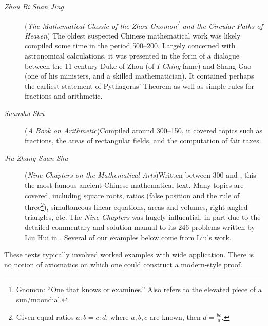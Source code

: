 \begin{description}
	\item[\normalfont\emph{Zhou Bi Suan Jing}] (\emph{The Mathematical Classic of the Zhou Gnomon\footnote{Gnomon: ``One that knows or examines.'' Also refers to the elevated piece of a sun/moondial.} and the Circular Paths of Heaven})\newline
The oldest suspected Chinese mathematical work was likely compiled some time in the period 500--200\BC. Largely concerned with astronomical calculations, it was presented in the form of a dialogue between the 11\th{} century Duke of Zhou (of \emph{I Ching} fame) %
and Shang Gao (one of his ministers, and a skilled mathematician). It contained perhaps the earliest statement of Pythagoras' Theorem as well as simple rules for fractions and arithmetic.

	\item[\normalfont \emph{Suanshu Shu}] (\emph{A Book on Arithmetic})\lstsp Compiled around 300--150\BC, it covered topics such as fractions, the areas of rectangular fields, and the computation of fair taxes.

	\item[\normalfont \emph{Jiu Zhang Suan Shu}] (\emph{Nine Chapters on the Mathematical Arts})\lstsp Written between 300\BC{} and , this the most famous ancient Chinese mathematical text. Many topics are covered, including square roots, ratios (false position and the rule of three\footnote{Given equal ratios $a:b=c:d$, where $a,b,c$ are known, then $d=\frac{bc}a$.}), simultaneous linear equations, areas and volumes, right-angled triangles, etc. The \emph{Nine Chapters} was hugely influential, in part due to the detailed commentary and solution manual to its 246 problems written by Liu Hui in . Several of our examples below come from Liu's work. 
\end{description}

These texts typically involved worked examples with wide application. There is no notion of axiomatics on which one could construct a modern-style proof.



